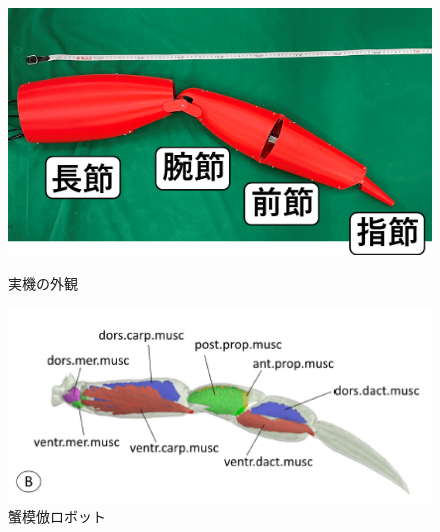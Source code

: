 \documentclass{jarticle}
\begin{document}
\begin{figure}[t]
  \begin{minipage}[b]{0.47\columnwidth}
    \centering
    \includegraphics[scale=0.1]{image/jikki_2.png}
    \vspace{-4mm}
    \caption{実機の外観}
    \label{fig:jikki}
  \end{minipage}
  \hspace{0.04\columnwidth}
  \begin{minipage}[b]{0.47\columnwidth}
    \centering
    \includegraphics[scale=0.35]{image/crabmuscle_campare.PNG}
    \vspace{-2mm}
    \caption{蟹模倣ロボット\cite{crab}}
    \label{fig:kinhaichi}
  \end{minipage}
\end{figure}
\end{document}
